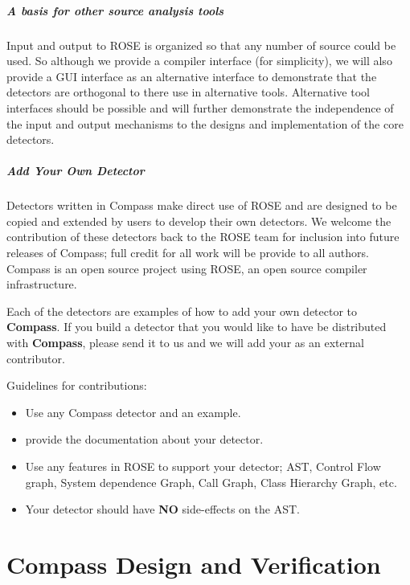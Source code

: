 \paragraph{A basis for other source analysis tools}
   Input and output to ROSE is organized so that any number of source could be used.
So although we provide a compiler interface (for simplicity), we will also provide a 
GUI interface as an alternative interface to demonstrate that the detectors are orthogonal
to there use in alternative tools.  Alternative tool interfaces should be possible 
and will further demonstrate the independence of the input and output mechanisms to
the designs and implementation of the core detectors.

\paragraph{Add Your Own Detector}

    Detectors written in Compass make direct use of ROSE and are 
designed to be copied and extended by users to develop their own 
detectors. We welcome the contribution of these detectors back to 
the ROSE team for inclusion into future releases of Compass;
full credit for all work will be provide to all authors.
Compass is an open source project using ROSE, an open source
compiler infrastructure.

    Each of the detectors are examples of how to
add your own detector to {\bf Compass}.  If you
build a detector that you would like to have be 
distributed with {\bf Compass}, please send it to
us and we will add your as an external contributor.

  Guidelines for contributions:
\begin{itemize}
   \item Use any Compass detector and an example.
   \item provide the documentation about your detector.
   \item Use any features in ROSE to support your detector; AST, Control Flow graph,
    System dependence Graph, Call Graph, Class Hierarchy Graph, etc.
   \item Your detector should have {\bf NO} side-effects on the AST.
\end{itemize}






\chapter{Compass Design and Verification}


